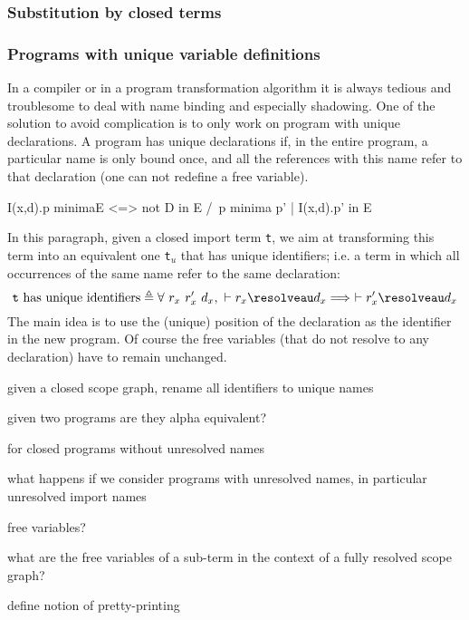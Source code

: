 \subsubsection{Substitution by closed terms}




\subsubsection{Programs with unique variable definitions}

In a compiler or in a program transformation algorithm it is always tedious and troublesome to deal with name binding and especially shadowing. One of the solution to avoid complication is to only work on program with unique declarations. A program has unique declarations if, in the entire program, a particular name is only bound once, and all the references with this name refer to that declaration (one can not redefine a free variable).  








I(x,d).p \in minima{E} <=> not D in E /\ p \in minima{ p' | I(x,d).p' in E } 


In this paragraph, given a closed import term {\tt t}, we aim at transforming this term into an equivalent one {\tt t$_u$} that has unique identifiers; i.e. a term in which all occurrences of the same name refer to the same declaration:
$$ \text{{\tt t} has unique identifiers} \triangleq \forall\ r_x\ r'_x\ d_x,\ \vdash r_x \resolveau d_x \Longrightarrow\ \vdash r'_x \resolveau d_x$$
The main idea is to use the (unique) position of the declaration as the identifier in the new program. Of course the free variables (that do not resolve to any declaration) have to remain unchanged.


	given a closed scope graph, rename all identifiers to unique names
	
	given two programs are they alpha equivalent?
	
	for closed programs without unresolved names
	
	what happens if we consider programs with unresolved names, in particular
	unresolved import names
	
	
	free variables?
	
	what are the free variables of a sub-term in the context of a fully resolved
	scope graph?
	
	define notion of pretty-printing
	
